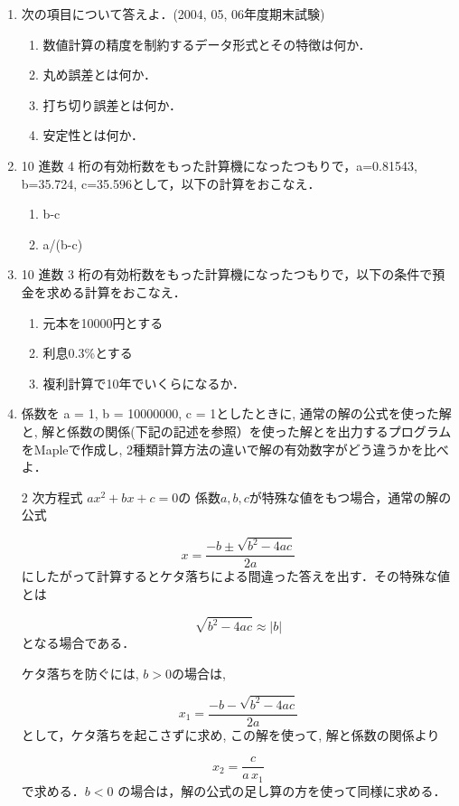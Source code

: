 \begin{enumerate}
\item 次の項目について答えよ．(2004, 05, 06年度期末試験)
\begin{enumerate}
\item 数値計算の精度を制約するデータ形式とその特徴は何か．
\item 丸め誤差とは何か．
\item 打ち切り誤差とは何か．
\item 安定性とは何か．
\end{enumerate}
\item 10 進数 4 桁の有効桁数をもった計算機になったつもりで，a=0.81543, b=35.724, c=35.596として，以下の計算をおこなえ．
  \begin{enumerate}
  \item b-c
  \item a/(b-c)
  \end{enumerate}
\item 10 進数 3 桁の有効桁数をもった計算機になったつもりで，以下の条件で預金を求める計算をおこなえ．
  \begin{enumerate}
  \item 元本を10000円とする
  \item 利息0.3\%とする
  \item 複利計算で10年でいくらになるか．
  \end{enumerate}
\item 係数を a = 1,  b = 10000000,  c = 1としたときに, 通常の解の公式を使った解と, 解と係数の関係(下記の記述を参照）を使った解とを出力するプログラムをMapleで作成し, 2種類計算方法の違いで解の有効数字がどう違うかを比べよ．

2 次方程式 $ax^2+bx+c=0$の
係数$a, b, c$が特殊な値をもつ場合，通常の解の公式 

\begin{equation*}
x = \frac {-b \pm \sqrt{{b}^{2}-4ac}}{2a}
\end{equation*}
にしたがって計算するとケタ落ちによる間違った答えを出す．その特殊な値とは

\begin{equation*}
\sqrt{{b}^{2}-4ac} \approx |b|
\end{equation*}
となる場合である．

ケタ落ちを防ぐには, $b > 0$の場合は,  

\begin{equation*}
x_1 = \frac {-b - \sqrt{{b}^{2}-4ac}}{2a}
\end{equation*}
として，ケタ落ちを起こさずに求め, この解を使って, 解と係数の関係より

\begin{equation*}
x_2 = \frac {c}{a\,  x_1}
\end{equation*}
で求める．$b < 0$ の場合は，解の公式の足し算の方を使って同様に求める．

\end{enumerate}
